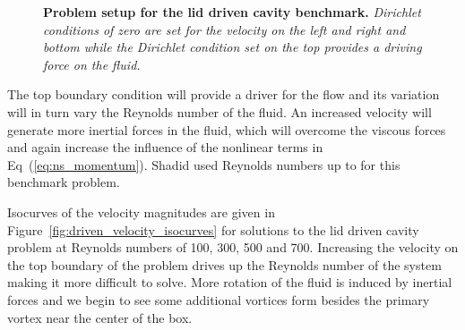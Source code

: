 \begin{figure}[t!]
  \begin{center}
    \scalebox{1.5}{
       }
  \end{center}
  \caption{\textbf{Problem setup for the lid driven cavity benchmark.}
    \textit{Dirichlet conditions of zero are set for the velocity on
      the left and right and bottom while the Dirichlet condition set
      on the top provides a driving force on the fluid.}}
  \label{fig:lid_driven_cavity}
\end{figure}

The top boundary condition will provide a driver for the flow and its
variation will in turn vary the Reynolds number of the fluid. An
increased velocity will generate more inertial forces in the fluid,
which will overcome the viscous forces and again increase the
influence of the nonlinear terms in Eq~(\ref{eq:ns_momentum}). Shadid
used Reynolds numbers up to  for this benchmark problem.

Isocurves of the velocity magnitudes are given in
Figure~\ref{fig:driven_velocity_isocurves} for solutions to the lid
driven cavity problem at Reynolds numbers of 100, 300, 500 and
700. Increasing the velocity on the top boundary of the problem drives
up the Reynolds number of the system making it more difficult to
solve. More rotation of the fluid is induced by inertial forces and we
begin to see some additional vortices form besides the primary vortex
near the center of the box.

